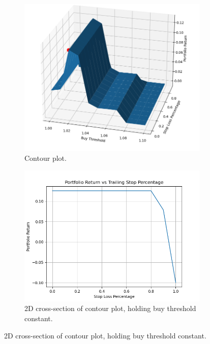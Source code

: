 \documentclass{article}
\begin{document}
\begin{figure}
    \centering
    \begin{subfigure}{0.495\textwidth}
        \centering
        \includegraphics[width=\linewidth]{bullContour.png}
        \caption{Contour plot.}
        \label{fig:bullcontourPlot}
    \end{subfigure}
    \hfill
    \begin{subfigure}{0.495\textwidth}
        \centering
        \includegraphics[width=\linewidth]{bullStopSlice.png}
        \caption{2D cross-section of contour plot, holding buy threshold constant.}
        \label{fig:bullbuyPlot}

\end{subfigure}
\end{figure}
\end{document}
